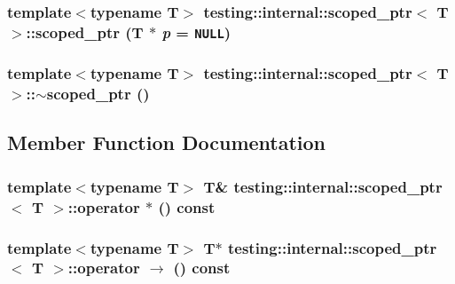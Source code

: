 \subsubsection{\setlength{\rightskip}{0pt plus 5cm}template$<$typename T$>$ {\bf testing::internal::scoped\_\-ptr}$<$ T $>$::{\bf scoped\_\-ptr} (T $\ast$ {\em p} = {\tt NULL})\hspace{0.3cm}{\tt  [inline, explicit]}}\label{classtesting_1_1internal_1_1scoped__ptr_d64fd9cf7bd2fbedc33faab80936bc76}


\subsubsection{\setlength{\rightskip}{0pt plus 5cm}template$<$typename T$>$ {\bf testing::internal::scoped\_\-ptr}$<$ T $>$::$\sim${\bf scoped\_\-ptr} ()\hspace{0.3cm}{\tt  [inline]}}\label{classtesting_1_1internal_1_1scoped__ptr_247b0c77a21d51f27162969ffbaba0b9}




\subsection{Member Function Documentation}
\subsubsection{\setlength{\rightskip}{0pt plus 5cm}template$<$typename T$>$ T\& {\bf testing::internal::scoped\_\-ptr}$<$ T $>$::operator $\ast$ () const\hspace{0.3cm}{\tt  [inline]}}\label{classtesting_1_1internal_1_1scoped__ptr_4f09b3605e25cc95de3f11605536897f}


\subsubsection{\setlength{\rightskip}{0pt plus 5cm}template$<$typename T$>$ T$\ast$ {\bf testing::internal::scoped\_\-ptr}$<$ T $>$::operator $\rightarrow$  () const\hspace{0.3cm}{\tt  [inline]}}\label{classtesting_1_1internal_1_1scoped__ptr_6fd9083f55e1422d34cc5c224594dcc5}


